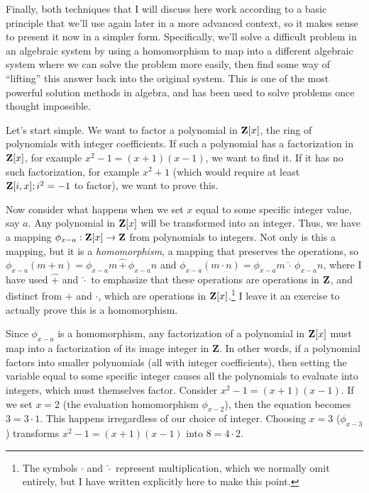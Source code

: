 Finally, both techniques that I will discuss here work according to a
basic principle that we'll use again later in a more advanced context,
so it makes sense to present it now in a simpler form.  Specifically,
we'll solve a difficult problem in an algebraic system by using a
homomorphism to map into a different algebraic system where we can
solve the problem more easily, then find some way of ``lifting'' this
answer back into the original system.  This is one of the most
powerful solution methods in algebra, and has been used to solve
problems once thought impossible.

Let's start simple.  We want to factor a polynomial in ${\bf Z}[x]$,
the ring of polynomials with integer coefficients.  If such a
polynomial has a factorization in ${\bf Z}[x]$, for example
$x^2-1=(x+1)(x-1)$, we want to find it.  If it has no such
factorization, for example $x^2+1$ (which would require at least ${\bf
Z}[i,x]; i^2=-1$ to factor), we want to prove this.

Now consider what happens when we set $x$ equal to some specific
integer value, say $a$.  Any polynomial in ${\bf Z}[x]$ will be
transformed into an integer.  Thus, we have a mapping $\phi_{x-a}:
{\bf Z}[x] \rightarrow {\bf Z}$ from polynomials to integers.  Not
only is this a mapping, but it is a {\it homomorphism}, a mapping that
preserves the operations, so $\phi_{x-a} (m+n) = \phi_{x-a}m \,\hat+\,
\phi_{x-a}n$ and $\phi_{x-a} (m\cdot n) = \phi_{x-a}m \,\hat\cdot\,
\phi_{x-a}n$, where I have used $\hat+$ and $\hat\cdot$ to emphasize
that these operations are operations in ${\bf Z}$, and distinct from
$+$ and $\cdot$, which are operations in ${\bf Z}[x]$.\footnote{The
symbols $\cdot$ and $\hat\cdot$ represent multiplication, which we normally
omit entirely, but I have written explicitly here to make this point.}
I leave it an exercise to actually prove this is a homomorphism.

Since $\phi_{x-a}$ is a homomorphism, any factorization of a
polynomial in ${\bf Z}[x]$ must map into a factorization of its image
integer in {\bf Z}.  In other words, if a polynomial factors into
smaller polynomials (all with integer coefficients), then setting the
variable equal to some specific integer causes all the polynomials to
evaluate into integers, which must themselves factor.  Consider
$x^2-1=(x+1)(x-1)$.  If we set $x=2$ (the evaluation homomorphism
$\phi_{x-2}$), then the equation becomes $3=3\cdot1$.  This happens
irregardless of our choice of integer.  Choosing $x=3$ ($\phi_{x-3}$)
transforms $x^2-1=(x+1)(x-1)$ into $8=4\cdot2$.

